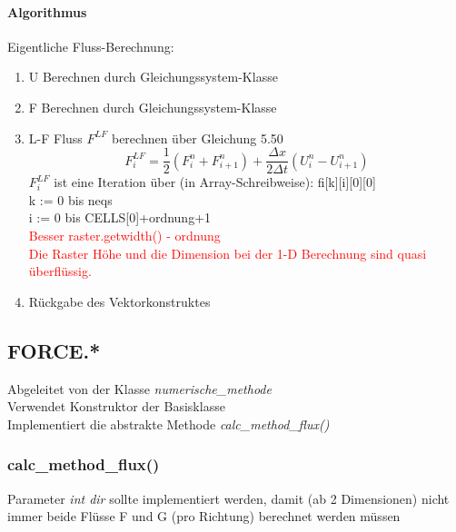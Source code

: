 \documentclass[12pt]{article}
\begin{document}
\paragraph{Algorithmus}
Eigentliche Fluss-Berechnung:\\
\begin{enumerate}
	\item U Berechnen durch Gleichungssystem-Klasse
	\item F Berechnen durch Gleichungssystem-Klasse
	\item L-F Fluss $F^{LF}$ berechnen über Gleichung 5.50\\
	\begin{equation}
	F^{LF}_i = \frac{1}{2}\left(F_i^n+F_{i+1}^n \right) + \frac{\Delta x}{2
		\Delta t}\left(U_i^n - U_{i+1}^n \right)\label{eq:fluss_LF}
	\end{equation}
	$F^{LF}_i$ ist eine Iteration über (in Array-Schreibweise): fi[k][i][0][0]\\
	k := 0 bis neqs\\
	i := 0 bis CELLS[0]+ordnung+1\\
	\textcolor{red}{Besser raster.getwidth() - ordnung\\
	Die Raster Höhe und die Dimension bei der 1-D Berechnung sind quasi überflüssig.}
	\item Rückgabe des Vektorkonstruktes
\end{enumerate}

\subsection{FORCE.*}
Abgeleitet von der Klasse {\em numerische\_methode}\\
Verwendet Konstruktor der Basisklasse \\
Implementiert die abstrakte Methode {\em calc\_method\_flux()} \\

\subsubsection{calc\_method\_flux()} \label{sssec:forcecalc}
Parameter {\em int dir} sollte implementiert werden, damit (ab 2 Dimensionen) nicht immer beide Flüsse F und G (pro Richtung) berechnet werden müssen
\end{document}
